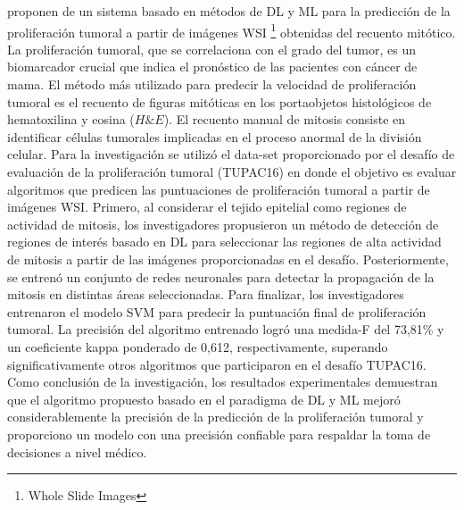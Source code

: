 \cite{Nateghi2021} proponen de un sistema basado en métodos de DL y ML para la predicción de la proliferación tumoral a partir de imágenes WSI \footnote{ Whole Slide Images } obtenidas del recuento mitótico. La proliferación tumoral, que se correlaciona con el grado del tumor, es un biomarcador crucial que indica el pronóstico de las pacientes con cáncer de mama. El método más utilizado para predecir la velocidad de proliferación tumoral es el recuento de figuras mitóticas en los portaobjetos histológicos de hematoxilina y eosina ($H\&E$). El recuento manual de mitosis consiste en identificar células tumorales implicadas en el proceso anormal de la división celular. Para la investigación se utilizó el data-set proporcionado por el desafío de evaluación de la proliferación tumoral (TUPAC16) en donde el objetivo es evaluar algoritmos que predicen las puntuaciones de proliferación tumoral a partir de imágenes WSI. Primero, al considerar el tejido epitelial como regiones de actividad de mitosis, los investigadores propusieron un método de detección de regiones de interés basado en DL para seleccionar las regiones de alta actividad de mitosis a partir de las imágenes proporcionadas en el desafío. Posteriormente, se entrenó un conjunto de redes neuronales para detectar la propagación de la mitosis en distintas áreas seleccionadas. Para finalizar, los investigadores entrenaron el modelo SVM para predecir la puntuación final de proliferación tumoral. La precisión del algoritmo entrenado logró una medida-F del 73,81\% y un coeficiente kappa ponderado de 0,612, respectivamente, superando significativamente otros algoritmos que participaron en el desafío TUPAC16. Como conclusión de la investigación, los resultados experimentales demuestran que el algoritmo propuesto basado en el paradigma de DL y ML mejoró considerablemente la precisión de la predicción de la proliferación tumoral y proporciono un modelo con una precisión confiable para respaldar la toma de decisiones a nivel médico.

